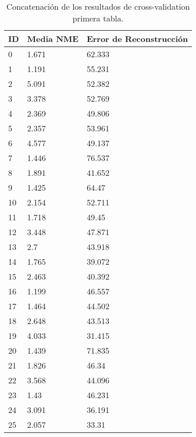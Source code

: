 \begin{table}[!ht]
    \centering
    \caption{Concatenación de los resultados de cross-validation primera tabla.}
    \begin{tabular}{|l|l|l|}
    \hline
        \cellcolor{gray!25}\textbf{ID} & \cellcolor{gray!25}\textbf{Media NME} & \cellcolor{gray!25}\textbf{Error de Reconstrucción} \\ \hline
        0 & 1.671 & 62.333 \\ \hline
        1 & 1.191 & 55.231 \\ \hline
        2 & 5.091 & 52.382 \\ \hline
        3 & 3.378 & 52.769 \\ \hline
        4 & 2.369 & 49.806 \\ \hline
        5 & 2.357 & 53.961 \\ \hline
        6 & 4.577 & 49.137 \\ \hline
        7 & 1.446 & 76.537 \\ \hline
        8 & 1.891 & 41.652 \\ \hline
        9 & 1.425 & 64.47 \\ \hline
        10 & 2.154 & 52.711 \\ \hline
        11 & 1.718 & 49.45 \\ \hline
        12 & 3.448 & 47.871 \\ \hline
        13 & 2.7 & 43.918 \\ \hline
        14 & 1.765 & 39.072 \\ \hline
        15 & 2.463 & 40.392 \\ \hline
        16 & 1.199 & 46.557 \\ \hline
        17 & 1.464 & 44.502 \\ \hline
        18 & 2.648 & 43.513 \\ \hline
        19 & 4.033 & 31.415 \\ \hline
        20 & 1.439 & 71.835 \\ \hline
        21 & 1.826 & 46.34 \\ \hline
        22 & 3.568 & 44.096 \\ \hline
        23 & 1.43 & 46.231 \\ \hline
        24 & 3.091 & 36.191 \\ \hline
        25 & 2.057 & 33.31 \\ \hline
    \end{tabular}
    \label{table:ModelBase_landmarkresume}
\end{table}


